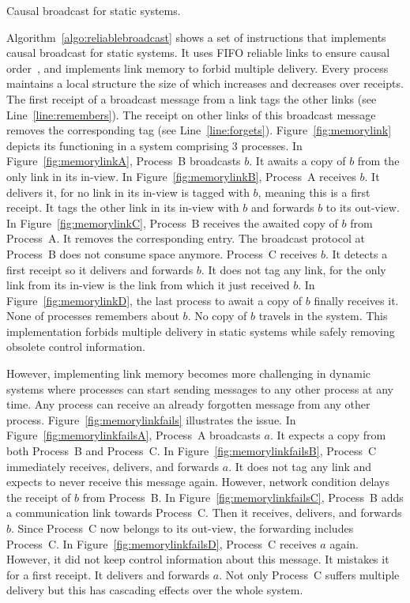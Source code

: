 \begin{algorithm}[h]
  
  \caption{\label{algo:reliablebroadcast}Causal broadcast for static systems.}
\end{algorithm}

Algorithm~\ref{algo:reliablebroadcast} shows a set of instructions that
implements causal broadcast for static systems. It uses FIFO reliable links to
ensure causal order~\cite{friedman2004causal}, and implements link memory
to forbid multiple delivery. Every process maintains a local structure the size
of which increases and decreases over receipts.  The first receipt of a
broadcast message from a link tags the other links (see
Line~\ref{line:remembers}). The receipt on other links of this broadcast message
removes the corresponding tag (see
Line~\ref{line:forgets}). Figure~\ref{fig:memorylink} depicts its functioning in
a system comprising 3 processes. In Figure~\ref{fig:memorylinkA}, Process~B
broadcasts $b$. It awaits a copy of $b$ from the only link in its in-view. In
Figure~\ref{fig:memorylinkB}, Process~A receives $b$. It delivers it, for no
link in its in-view is tagged with $b$, meaning this is a first receipt. It tags
the other link in its in-view with $b$ and forwards $b$ to its out-view. In
Figure~\ref{fig:memorylinkC}, Process~B receives the awaited copy of $b$ from
Process~A. It removes the corresponding entry. The broadcast protocol at
Process~B does not consume space anymore. Process~C receives $b$. It detects a
first receipt so it delivers and forwards $b$. It does not tag any link, for the
only link from its in-view is the link from which it just received $b$. In
Figure~\ref{fig:memorylinkD}, the last process to await a copy of $b$ finally
receives it. None of processes remembers about $b$. No copy of $b$ travels in
the system. This implementation forbids multiple delivery in static systems
while safely removing obsolete control information.



However, implementing link memory becomes more challenging in dynamic
systems where processes can start sending messages to any other process at any
time. Any process can receive an already forgotten message from any other
process. Figure~\ref{fig:memorylinkfails} illustrates the issue. In
Figure~\ref{fig:memorylinkfailsA}, Process~A broadcasts $a$. It expects a copy
from both Process~B and Process~C. In Figure~\ref{fig:memorylinkfailsB},
Process~C immediately receives, delivers, and forwards $a$. It does not tag any
link and expects to never receive this message again. However, network condition
delays the receipt of $b$ from Process~B. In Figure~\ref{fig:memorylinkfailsC},
Process~B adds a communication link towards Process~C. Then it receives,
delivers, and forwards $b$. Since Process~C now belongs to its out-view, the
forwarding includes Process~C. In Figure~\ref{fig:memorylinkfailsD}, Process~C
receives $a$ again. However, it did not keep control information about this
message. It mistakes it for a first receipt. It delivers and forwards $a$. Not
only Process~C suffers multiple delivery but this has cascading effects over the
whole system.

